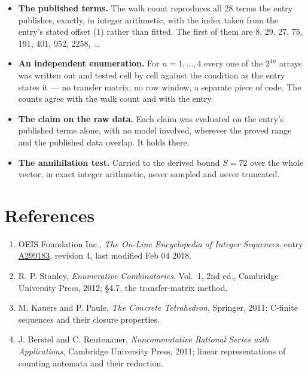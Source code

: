 \documentclass[11pt]{article}
\theoremstyle{definition}
\begin{document}
\begin{itemize}

\item {\bfseries The published terms.} The walk count reproduces all 28 terms the entry publishes, exactly, in integer arithmetic, with the index taken from the entry's stated offset (1) rather than fitted. The first of them are 8, 29, 27, 75, 191, 401, 952, 2258,~\dots

\item {\bfseries An independent enumeration.} For $n = 1,\dots,4$ every one of the $2^{4n}$ arrays was written out and tested cell by cell against the condition as the entry states it --- no transfer matrix, no row window, a separate piece of code. The counts agree with the walk count and with the entry.

\item {\bfseries The claim on the raw data.} Each claim was evaluated on the entry's published terms alone, with no model involved, wherever the proved range and the published data overlap. It holds there.

\item {\bfseries The annihilation test.} Carried to the derived bound $S = 72$ over the whole vector, in exact integer arithmetic, never sampled and never truncated.

\end{itemize}

\section{References}

\begin{enumerate}

\item OEIS Foundation Inc., \emph{The On-Line Encyclopedia of Integer Sequences}, entry \href{https://oeis.org/A299183}{A299183}, revision 4, last modified Feb 04 2018.

\item R. P. Stanley, \emph{Enumerative Combinatorics}, Vol.~1, 2nd ed., Cambridge University Press, 2012; \S4.7, the transfer-matrix method.

\item M. Kauers and P. Paule, \emph{The Concrete Tetrahedron}, Springer, 2011; C-finite sequences and their closure properties.

\item J. Berstel and C. Reutenauer, \emph{Noncommutative Rational Series with Applications}, Cambridge University Press, 2011; linear representations of counting automata and their reduction.

\end{enumerate}
\end{document}
